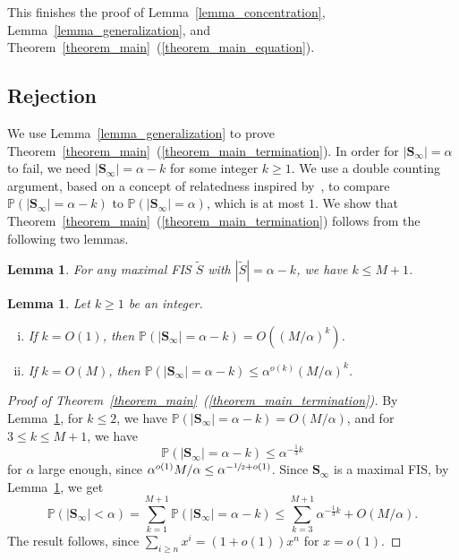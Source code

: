 \documentclass{article}
\theoremstyle{plain}
\theoremstyle{remark}
\theoremstyle{plain}
\newtheorem{lemma}[theorem]{Lemma}
\numberwithin{equation}{section}
\begin{document}
	This finishes the proof of Lemma~\ref{lemma_concentration}, Lemma~\ref{lemma_generalization}, and Theorem~\ref{theorem_main}~(\ref{theorem_main_equation}).
	
	\subsection{Rejection}\label{subsection_proof_termination}
	
	We use Lemma~\ref{lemma_generalization} to prove Theorem~\ref{theorem_main}~(\ref{theorem_main_termination}). In order for $|\boldsymbol{S}_{\infty}|=\alpha$ to fail, we need $|\boldsymbol{S}_{\infty}|=\alpha-k$ for some integer $k\geq1$. We use a double counting argument, based on a concept of relatedness inspired by~\cite{MCKAY2003273}, to compare $\mathbb{P}(|\boldsymbol{S}_{\infty}|=\alpha-k)$ to $\mathbb{P}(|\boldsymbol{S}_{\infty}|=\alpha)$, which is at most $1$. We show that Theorem~\ref{theorem_main}~(\ref{theorem_main_termination}) follows from the following two lemmas.
	
	\begin{lemma}\label{lemma_size}
		For any maximal FIS $\widetilde{S}$ with $|\widetilde{S}|=\alpha-k$, we have $k\leq M+1$.
	\end{lemma}
	
	\begin{lemma}\label{lemma_stuck}
		Let $k\geq1$ be an integer.
		\begin{enumerate}[(i)]
			\item\label{lemma_stuck_small} If $k=O(1)$, then $\mathbb{P}(|\boldsymbol{S}_{\infty}|=\alpha-k)=O((M/\alpha)^k)$.
			\item\label{lemma_stuck_large} If $k=O(M)$, then $\mathbb{P}(|\boldsymbol{S}_{\infty}|=\alpha-k)\leq\alpha^{o(k)}(M/\alpha)^k$.
		\end{enumerate}
	\end{lemma}
	
	\begin{proof}[Proof of Theorem~\ref{theorem_main}~(\ref{theorem_main_termination})]
		By Lemma~\ref{lemma_stuck}, for $k\leq2$, we have $\mathbb{P}(|\boldsymbol{S}_{\infty}|=\alpha-k)=O(M/\alpha)$, and for $3\leq k\leq M+1$, we have $$\mathbb{P}(|\boldsymbol{S}_{\infty}|=\alpha-k)\leq\alpha^{-\frac13k}$$ for $\alpha$ large enough, since $\alpha^{o(1)}M/\alpha\leq\alpha^{-\sfrac12+o(1)}$. Since $\boldsymbol{S}_{\infty}$ is a maximal FIS, by Lemma~\ref{lemma_size}, we get $$\mathbb{P}(|\boldsymbol{S}_{\infty}|<\alpha)=\sum_{k=1}^{M+1}\mathbb{P}(|\boldsymbol{S}_{\infty}|=\alpha-k)\leq\sum_{k=3}^{M+1}\alpha^{-\frac13k}+O(M/\alpha).$$ The result follows, since $\sum_{i\geq n}x^i=(1+o(1))x^n$ for $x=o(1)$.
	\end{proof}
	
\end{document}
